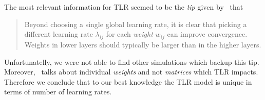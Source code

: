 The most relevant information for TLR seemed to be the \emph{tip} given by~\citet{lecun2012efficient} that \blockquote{Beyond choosing a single global learning rate, it is clear that picking a different learning rate $\lambda_{ij}$ for each \emph{weight} $w_{ij}$ can improve convergence. Weights in lower layers should typically be larger than in the higher layers.} Unfortunatelly, we were not able to find other simulations which backup this tip. Moreover,~\citet{lecun2012efficient} talks about individual \emph{weights} and not \emph{matrices} which TLR impacts. Therefore we conclude that to our best knowledge the TLR model is unique in terms of number of learning rates. 

